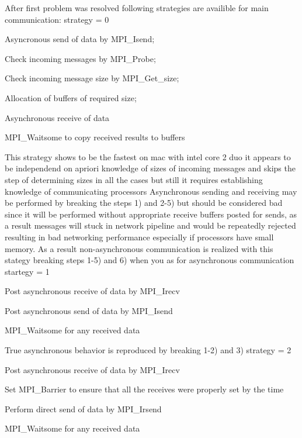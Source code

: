 After first problem was resolved following strategies are availible for main communication\-: strategy = 0
\begin{DoxyEnumerate}
\item Asyncronous send of data by M\-P\-I\-\_\-\-Isend;
\item Check incoming messages by M\-P\-I\-\_\-\-Probe;
\item Check incoming message size by M\-P\-I\-\_\-\-Get\-\_\-size;
\item Allocation of buffers of required size;
\item Asynchronous receive of data
\item M\-P\-I\-\_\-\-Waitsome to copy received results to buffers
\end{DoxyEnumerate}

This strategy shows to be the fastest on mac with intel core 2 duo it appears to be independend on apriori knowledge of sizes of incoming messages and skips the step of determining sizes in all the cases but still it requires establishing knowledge of communicating processors Asynchronous sending and receiving may be performed by breaking the steps 1) and 2-\/5) but should be considered bad since it will be performed without appropriate receive buffers posted for sends, as a result messages will stuck in network pipeline and would be repeatedly rejected resulting in bad networking performance especially if processors have small memory. As a result non-\/asynchronous communication is realized with this stategy breaking steps 1-\/5) and 6) when you as for asynchronous communication startegy = 1
\begin{DoxyEnumerate}
\item Post asynchronous receive of data by M\-P\-I\-\_\-\-Irecv
\item Post asynchronous send of data by M\-P\-I\-\_\-\-Isend
\item M\-P\-I\-\_\-\-Waitsome for any received data
\end{DoxyEnumerate}

True asynchronous behavior is reproduced by breaking 1-\/2) and 3) strategy = 2
\begin{DoxyEnumerate}
\item Post asynchronous receive of data by M\-P\-I\-\_\-\-Irecv
\item Set M\-P\-I\-\_\-\-Barrier to ensure that all the receives were properly set by the time
\end{DoxyEnumerate}
\begin{DoxyEnumerate}
\item Perform direct send of data by M\-P\-I\-\_\-\-Irsend
\item M\-P\-I\-\_\-\-Waitsome for any received data
\end{DoxyEnumerate}


